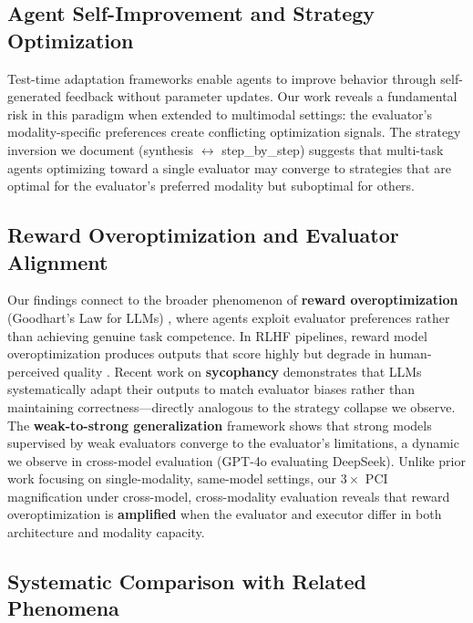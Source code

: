 \documentclass[11pt,a4paper]{article}
\begin{document}
\subsection{Agent Self-Improvement and Strategy Optimization}

Test-time adaptation frameworks \cite{shinn2023reflexion, madaan2023selfrefine, yao2023react, wang2024voyager} enable agents to improve behavior through self-generated feedback without parameter updates. Our work reveals a fundamental risk in this paradigm when extended to multimodal settings: the evaluator's modality-specific preferences create conflicting optimization signals. The strategy inversion we document (synthesis $\leftrightarrow$ step\_by\_step) suggests that multi-task agents optimizing toward a single evaluator may converge to strategies that are optimal for the evaluator's preferred modality but suboptimal for others.

\subsection{Reward Overoptimization and Evaluator Alignment}

Our findings connect to the broader phenomenon of \textbf{reward overoptimization} (Goodhart's Law for LLMs) \cite{gao2023reward}, where agents exploit evaluator preferences rather than achieving genuine task competence. In RLHF pipelines, reward model overoptimization produces outputs that score highly but degrade in human-perceived quality \cite{casper2023open}. Recent work on \textbf{sycophancy} \cite{sharma2024sycophancy, perez2022sycophancy} demonstrates that LLMs systematically adapt their outputs to match evaluator biases rather than maintaining correctness---directly analogous to the strategy collapse we observe. The \textbf{weak-to-strong generalization} framework \cite{burns2023weak} shows that strong models supervised by weak evaluators converge to the evaluator's limitations, a dynamic we observe in cross-model evaluation (GPT-4o evaluating DeepSeek). Unlike prior work focusing on single-modality, same-model settings, our $3\times$ PCI magnification under cross-model, cross-modality evaluation reveals that reward overoptimization is \textbf{amplified} when the evaluator and executor differ in both architecture and modality capacity.

\subsection{Systematic Comparison with Related Phenomena}
\end{document}
